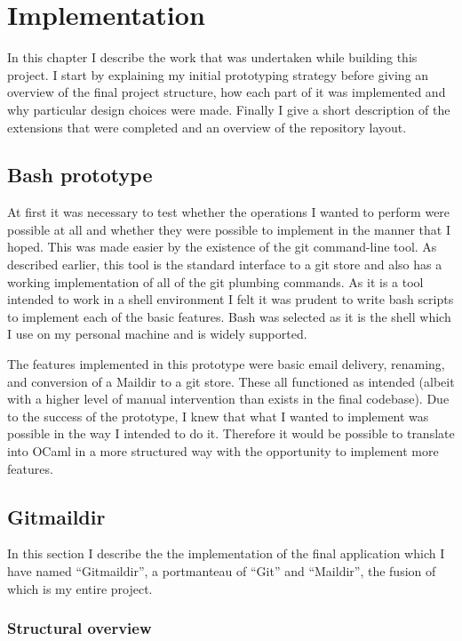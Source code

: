 \chapter{Implementation}

In this chapter I describe the work that was undertaken while building this project. I start by explaining my initial prototyping strategy before giving an overview of the final project structure, how each part of it was implemented and why particular design choices were made. Finally I give a short description of the extensions that were completed and an overview of the repository layout.

\section{Bash prototype}

At first it was necessary to test whether the operations I wanted to perform were possible at all and whether they were possible to implement in the manner that I hoped. This was made easier by the existence of the git command-line tool. As described earlier, this tool is the standard interface to a git store and also has a working implementation of all of the git plumbing commands. As it is a tool intended to work in a shell environment I felt it was prudent to write bash scripts to implement each of the basic features. Bash was selected as it is the shell which I use on my personal machine and is widely supported.

The features implemented in this prototype were basic email delivery, renaming, and conversion of a Maildir to a git store. These all functioned as intended (albeit with a higher level of manual intervention than exists in the final codebase). Due to the success of the prototype, I knew that what I wanted to implement was possible in the way I intended to do it. Therefore it would be possible to translate into OCaml in a more structured way with the opportunity to implement more features.

\section{Gitmaildir}

In this section I describe the the implementation of the final application which I have named ``Gitmaildir'', a portmanteau of ``Git'' and ``Maildir'', the fusion of which is my entire project.

\subsection{Structural overview}

